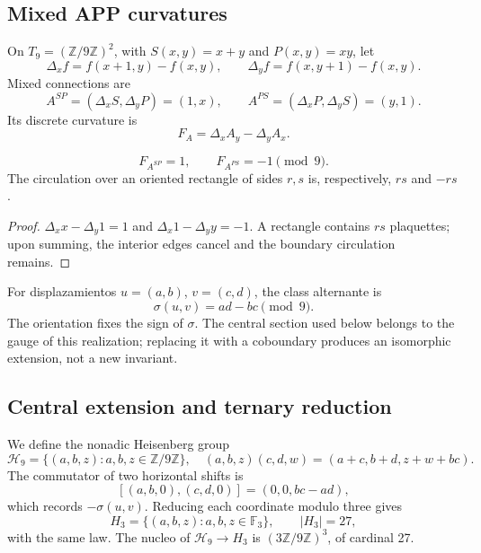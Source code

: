 \subsection{Mixed APP curvatures}

On \(T_9=(\mathbb Z/9\mathbb Z)^2\), with
\(S(x,y)=x+y\) and \(P(x,y)=xy\), let
\[
 \Delta_xf=f(x+1,y)-f(x,y),\qquad
 \Delta_yf=f(x,y+1)-f(x,y).
\]
Mixed connections are
\[
 A^{SP}=(\Delta_xS,\Delta_yP)=(1,x),\qquad
 A^{PS}=(\Delta_xP,\Delta_yS)=(y,1).
\]
Its discrete curvature is
\[
 F_A=\Delta_xA_y-\Delta_yA_x.
\]

\begin{proposition}
\label{p12-83-c20-s6:prop:curvaturas-app-e6-nuevo}
\[
 F_{A^{SP}}=1,\qquad F_{A^{PS}}=-1\pmod9.
\]
The circulation over an oriented rectangle of sides \(r,s\) is,
respectively, \(rs\) and \(-rs\).
\end{proposition}

\begin{proof}
\(\Delta_xx-\Delta_y1=1\) and
\(\Delta_x1-\Delta_yy=-1\). A rectangle contains \(rs\) plaquettes; upon
summing, the interior edges cancel and the boundary circulation remains.
\end{proof}

For displazamientos \(u=(a,b)\), \(v=(c,d)\), the class alternante is
\begin{equation}
 \sigma(u,v)=ad-bc\pmod9.
 \label{p12-83-c20-s6:eq:forma-alternante-e6-nueva}
\end{equation}
The orientation fixes the sign of \(\sigma\). The central section used
below belongs to the gauge of this realization; replacing it with a coboundary
produces an isomorphic extension, not a new invariant.

\subsection{Central extension and ternary reduction}

We define the nonadic Heisenberg group
\begin{equation}
 \mathcal H_9=\{(a,b,z):a,b,z\in\mathbb Z/9\mathbb Z\},
 \quad
 (a,b,z)(c,d,w)=(a+c,b+d,z+w+bc).
 \label{p12-83-c20-s6:eq:heisenberg-9-nuevo}
\end{equation}
The commutator of two horizontal shifts is
\[
 [(a,b,0),(c,d,0)]=(0,0,bc-ad),
\]
which records \(-\sigma(u,v)\). Reducing each coordinate modulo three
gives
\begin{equation}
 H_3=\{(a,b,z):a,b,z\in\mathbb F_3\},\qquad |H_3|=27,
 \label{p12-83-c20-s6:eq:heisenberg-3-nuevo}
\end{equation}
with the same law. The nucleo of
\(\mathcal H_9\to H_3\) is
\((3\mathbb Z/9\mathbb Z)^3\), of cardinal 27.

